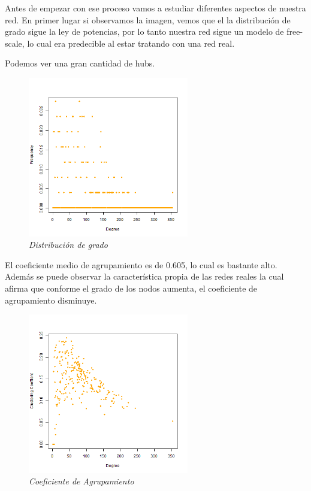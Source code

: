 Antes de empezar con ese proceso vamos a estudiar diferentes aspectos de nuestra red. En primer lugar si observamos la imagen, vemos que el la distribución de grado sigue la ley de potencias, por lo tanto nuestra red sigue un modelo de free-scale, lo cual era predecible al estar tratando con una red real. 

Podemos  ver una gran cantidad de hubs. 
\begin{figure}
	\centering
	
	\includegraphics[width=70mm,scale=1.2]{figures/degree_distribution.png}
	
	\caption{\textit{Distribución de grado}}
	
\end{figure}

El coeficiente medio de agrupamiento es de 0.605, lo cual es bastante alto. Además se puede observar la característica propia de las redes reales la cual afirma que conforme el grado de los nodos aumenta, el coeficiente de agrupamiento disminuye. 

\begin{figure}
	\centering
	
	\includegraphics[width=70mm,scale=1.2]{figures/coeficiente_agrupamiento.png}
	
	\caption{\textit{Coeficiente de Agrupamiento}}
	
\end{figure}


